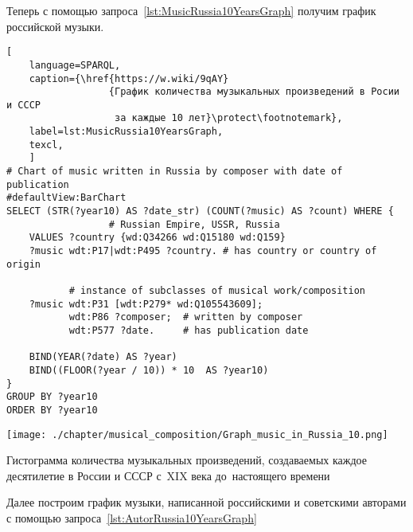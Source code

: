 Теперь с помощью запроса~\ref{lst:MusicRussia10YearsGraph} получим график российской музыки.

\begin{lstlisting}[ 
    language=SPARQL,
    caption={\href{https://w.wiki/9qAY}
                  {График количества музыкальных произведений в Росии и СССР 
                   за каждые 10 лет}\protect\footnotemark},
    label=lst:MusicRussia10YearsGraph,
    texcl,
    ]
# Chart of music written in Russia by composer with date of publication
#defaultView:BarChart
SELECT (STR(?year10) AS ?date_str) (COUNT(?music) AS ?count) WHERE {
                  # Russian Empire, USSR, Russia
    VALUES ?country {wd:Q34266 wd:Q15180 wd:Q159}
    ?music wdt:P17|wdt:P495 ?country. # has country or country of origin  
    
           # instance of subclasses of musical work/composition
    ?music wdt:P31 [wdt:P279* wd:Q105543609];
           wdt:P86 ?composer;  # written by composer
           wdt:P577 ?date.     # has publication date
    
    BIND(YEAR(?date) AS ?year)
    BIND((FLOOR(?year / 10)) * 10  AS ?year10)
}
GROUP BY ?year10
ORDER BY ?year10
\end{lstlisting}%

\begin{marginfigure}[0\baselineskip]
	\texttt{[image: ./chapter/musical\_composition/Graph\_music\_in\_Russia\_10.png]}
    \vspace{-7pt}
	\caption{Гистограмма количества музыкальных произведений, 
             создаваемых каждое десятилетие в России и СССР с~XIX века до~настоящего времени}%
	\label{fig:diagram_10_yearsRussia}%

\end{marginfigure}

Далее построим график музыки, написанной российскими и советскими авторами с помощью запроса~\ref{lst:AutorRussia10YearsGraph}

